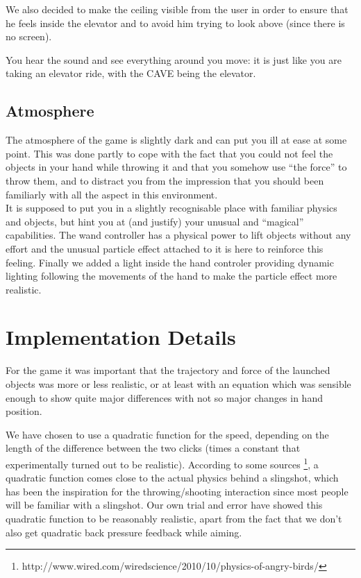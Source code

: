 \documentclass[a4paper]{article}
\begin{document}
We also decided to make the ceiling
visible from the user in order to ensure that he feels inside the elevator and to avoid him 
trying to look above (since there is no screen).

You hear the sound and see everything around you move: it is just like you are taking
an elevator ride, with the CAVE being the elevator.

\subsection{Atmosphere}
The atmosphere of the game is slightly dark and can put you ill at ease at some
point. This was done partly to cope with the fact that you could not feel the objects
in your hand while throwing it and that you somehow use ``the force'' to throw them,
and to distract you from the impression that you should been familiarly with all the
aspect in this environment.\\
It is supposed to put you in a slightly recognisable place with familiar physics and
objects, but hint you at (and justify) your unusual and ``magical'' capabilities. The wand
controller has a physical power to lift objects without any effort and the unusual particle effect attached to
it is here to reinforce this feeling. Finally we added a light inside the hand controler
providing dynamic lighting following the movements of the hand to make the particle effect more realistic.


\section{Implementation Details}
\label{sec:inner}
For the game it was important that the trajectory and force of the launched objects was
more or less realistic, or at least with an equation which was sensible enough
to show quite major differences with not so major changes in hand position.

We have chosen to use a quadratic function for the speed, depending on the length
of the difference between the two clicks (times a constant that experimentally
turned out to be realistic). According to some sources
\footnote{http://www.wired.com/wiredscience/2010/10/physics-of-angry-birds/},
a quadratic function comes close to the actual physics behind a slingshot, which
has been the inspiration for the throwing/shooting interaction since most people
will be familiar with a slingshot. Our own trial and error have showed this quadratic
function to be reasonably realistic, apart from the fact that we don't also get
quadratic back pressure feedback while aiming.
\end{document}
